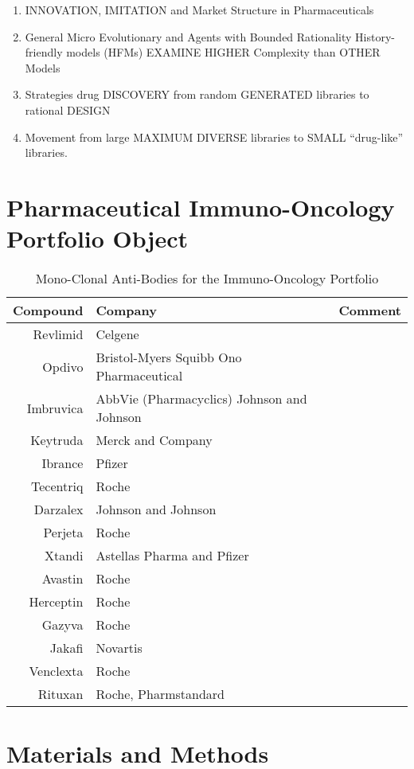 


\begin{enumerate}
	\item INNOVATION, IMITATION and Market Structure in Pharmaceuticals \cite{key400}
	\item General Micro Evolutionary and Agents with Bounded Rationality History-friendly models (HFMs) EXAMINE HIGHER Complexity than OTHER Models \cite{key400}
	\item Strategies drug DISCOVERY from random GENERATED libraries to rational DESIGN \cite{key500}
	\item Movement from large MAXIMUM DIVERSE libraries to SMALL “drug-like” libraries. \cite{key500}
\end{enumerate}

\section{Pharmaceutical Immuno-Oncology Portfolio Object}

\begin{table}
	\caption{Mono-Clonal Anti-Bodies for the Immuno-Oncology Portfolio \cite{key8001} }
	\begin{tabular}{r|p{4cm}|l}
		Compound & Company & Comment \\
		\hline
		Revlimid & Celgene & \\
		Opdivo & Bristol-Myers Squibb Ono Pharmaceutical & \\
		Imbruvica & AbbVie (Pharmacyclics) Johnson and Johnson & \\
		Keytruda & Merck and Company & \\
		Ibrance & Pfizer & \\
		Tecentriq & Roche & \\
		Darzalex & Johnson and Johnson & \\
		Perjeta & Roche & \\
		Xtandi & Astellas Pharma and Pfizer & \\
		Avastin & Roche & \\
		Herceptin & Roche & \\
		Gazyva & Roche & \\
		Jakafi & Novartis & \\
		Venclexta & Roche & \\
		Rituxan & Roche, Pharmstandard & \\
		\hline
	\end{tabular}
\end{table}

\section{Materials and Methods}

